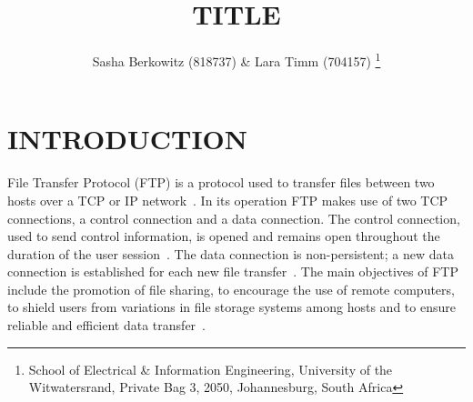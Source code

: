 \documentclass[10pt,twocolumn]{witseiepaper}
\begin{document}
\title{TITLE}

\author{Sasha Berkowitz (818737) \& Lara Timm (704157)
\thanks{School of Electrical \& Information Engineering, University of the
Witwatersrand, Private Bag 3, 2050, Johannesburg, South Africa}
}


%

\keywords{}

\maketitle
\pagestyle{plain}
\setcounter{page}{1}


\section{INTRODUCTION}

File Transfer Protocol (FTP) is a protocol used  to transfer files between two hosts over a TCP or IP network~\cite{FTPbeginners}. In its operation FTP makes use of two TCP connections, a control connection and a data connection. The control connection, used to send control information, is opened and remains open throughout the duration of the user session~\cite{topDownApproach6th}. The data connection is non-persistent; a new data connection is established for each new file transfer~\cite{topDownApproach6th}. The main objectives of FTP include the promotion of file sharing, to encourage the use of remote computers, to shield users from variations in file storage systems among hosts and to ensure reliable and efficient data transfer~\cite{rfc959}. 

\end{document}

